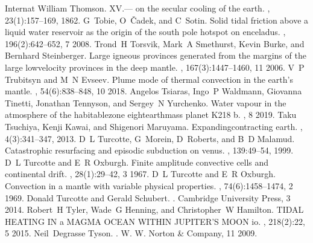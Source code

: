 \documentclass[letterpaper,10pt,english]{jupyterBook}
\begin{document}
\begin{sphinxthebibliography}{Internat}
\sphinxAtStartPar
William Thomson. XV.— on the secular cooling of the earth. , 23(1):157–169, 1862.
\sphinxAtStartPar
G Tobie, O Čadek, and C Sotin. Solid tidal friction above a liquid water reservoir as the origin of the south pole hotspot on enceladus. , 196(2):642–652, 7 2008.
\sphinxAtStartPar
Trond H Torsvik, Mark A Smethurst, Kevin Burke, and Bernhard Steinberger. Large igneous provinces generated from the margins of the large low\sphinxhyphen{}velocity provinces in the deep mantle. , 167(3):1447–1460, 11 2006.
\sphinxAtStartPar
V P Trubitsyn and M N Evseev. Plume mode of thermal convection in the earth's mantle. , 54(6):838–848, 10 2018.
\sphinxAtStartPar
Angelos Tsiaras, Ingo P Waldmann, Giovanna Tinetti, Jonathan Tennyson, and Sergey N Yurchenko. Water vapour in the atmosphere of the habitable\sphinxhyphen{}zone eight\sphinxhyphen{}earth\sphinxhyphen{}mass planet K2\sphinxhyphen{}18 b. , 8 2019.
\sphinxAtStartPar
Taku Tsuchiya, Kenji Kawai, and Shigenori Maruyama. Expanding\sphinxhyphen{}contracting earth. , 4(3):341–347, 2013.
\sphinxAtStartPar
D L Turcotte, G Morein, D Roberts, and B D Malamud. Catastrophic resurfacing and episodic subduction on venus. , 139:49–54, 1999.
\sphinxAtStartPar
D L Turcotte and E R Oxburgh. Finite amplitude convective cells and continental drift. , 28(1):29–42, 3 1967.
\sphinxAtStartPar
D L Turcotte and E R Oxburgh. Convection in a mantle with variable physical properties. , 74(6):1458–1474, 2 1969.
\sphinxAtStartPar
Donald Turcotte and Gerald Schubert. . Cambridge University Press, 3 2014.
\sphinxAtStartPar
Robert H Tyler, Wade G Henning, and Christopher W Hamilton. TIDAL HEATING IN a MAGMA OCEAN WITHIN JUPITER'S MOON io. , 218(2):22, 5 2015.
\sphinxAtStartPar
Neil Degrasse Tyson. . W. W. Norton \& Company, 11 2009.

\end{sphinxthebibliography}
\end{document}
